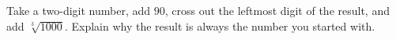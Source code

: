 Take a two-digit number, add $90$, cross out the leftmost digit of the result, and add $\sqrt[3]{1000}$. Explain why the result is always the number you started with.
